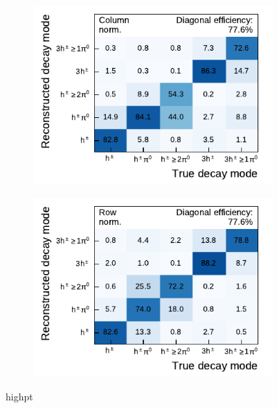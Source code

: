 \begin{figure}[htb]
  \begin{subfigure}{0.48\textwidth}
    \centering
    \includegraphics{./figures/decay_mode_classification/highpt/mig_mat_pt_geq_100.pdf}
  \end{subfigure}\hfill
  \begin{subfigure}{0.48\textwidth}
    \centering
    \includegraphics{./figures/decay_mode_classification/highpt/comp_mat_geq_100.pdf}
  \end{subfigure}
  \caption{highpt}
  \label{fig:highpt_matrices}
\end{figure}


